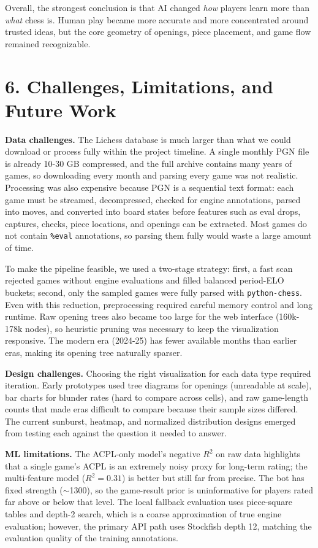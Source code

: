 \documentclass[a4paper]{article}
\begin{document}
Overall, the strongest conclusion is that AI changed \emph{how} players learn more than \emph{what} chess is. Human play became more accurate and more concentrated around trusted ideas, but the core geometry of openings, piece placement, and game flow remained recognizable.


\section*{6. Challenges, Limitations, and Future Work}

\textbf{Data challenges.}
The Lichess database is much larger than what we could download or process fully within the project timeline. A single monthly PGN file is already 10-30 GB compressed, and the full archive contains many years of games, so downloading every month and parsing every game was not realistic. Processing was also expensive because PGN is a sequential text format: each game must be streamed, decompressed, checked for engine annotations, parsed into moves, and converted into board states before features such as eval drops, captures, checks, piece locations, and openings can be extracted. Most games do not contain \texttt{\%eval} annotations, so parsing them fully would waste a large amount of time.

To make the pipeline feasible, we used a two-stage strategy: first, a fast scan rejected games without engine evaluations and filled balanced period-ELO buckets; second, only the sampled games were fully parsed with \texttt{python-chess}. Even with this reduction, preprocessing required careful memory control and long runtime. Raw opening trees also became too large for the web interface (160k-178k nodes), so heuristic pruning was necessary to keep the visualization responsive. The modern era (2024-25) has fewer available months than earlier eras, making its opening tree naturally sparser.

\textbf{Design challenges.}
Choosing the right visualization for each data type required iteration. Early prototypes used tree diagrams for openings (unreadable at scale), bar charts for blunder rates (hard to compare across cells), and raw game-length counts that made eras difficult to compare because their sample sizes differed. The current sunburst, heatmap, and normalized distribution designs emerged from testing each against the question it needed to answer.

\textbf{ML limitations.}
The ACPL-only model's negative $R^2$ on raw data highlights that a single game's ACPL is an extremely noisy proxy for long-term rating; the multi-feature model ($R^2 = 0.31$) is better but still far from precise. The bot has fixed strength ($\sim$1300), so the game-result prior is uninformative for players rated far above or below that level. The local fallback evaluation uses piece-square tables and depth-2 search, which is a coarse approximation of true engine evaluation; however, the primary API path uses Stockfish depth 12, matching the evaluation quality of the training annotations.
\end{document}

